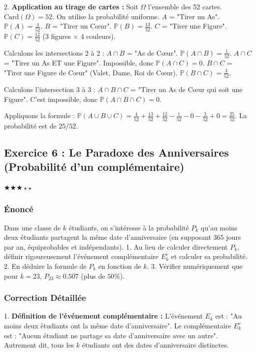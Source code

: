 \documentclass[11pt,a4paper]{article}
\begin{document}
2. \textbf{Application au tirage de cartes :}
Soit $\Omega$ l'ensemble des 52 cartes. $\text{Card}(\Omega) = 52$. On utilise la probabilité uniforme.
$A$ = "Tirer un As". $\mathbb{P}(A) = \frac{4}{52}$.
$B$ = "Tirer un Cœur". $\mathbb{P}(B) = \frac{13}{52}$.
$C$ = "Tirer une Figure". $\mathbb{P}(C) = \frac{12}{52}$ (3 figures $\times$ 4 couleurs).

Calculons les intersections 2 à 2 :
$A \cap B$ = "As de Cœur". $\mathbb{P}(A \cap B) = \frac{1}{52}$.
$A \cap C$ = "Tirer un As ET une Figure". Impossible, donc $\mathbb{P}(A \cap C) = 0$.
$B \cap C$ = "Tirer une Figure de Cœur" (Valet, Dame, Roi de Cœur). $\mathbb{P}(B \cap C) = \frac{3}{52}$.

Calculons l'intersection 3 à 3 :
$A \cap B \cap C$ = "Tirer un As de Cœur qui soit une Figure". C'est impossible, donc $\mathbb{P}(A \cap B \cap C) = 0$.

Appliquons la formule :
$\mathbb{P}(A \cup B \cup C) = \frac{4}{52} + \frac{13}{52} + \frac{12}{52} - \frac{1}{52} - 0 - \frac{3}{52} + 0 = \frac{25}{52}$.
La probabilité est de $25 / 52$.



\subsection*{Exercice 6 : Le Paradoxe des Anniversaires (Probabilité d'un complémentaire)}
$\bigstar\bigstar\bigstar\star\star$

\subsubsection*{Énoncé}

Dans une classe de $k$ étudiants, on s'intéresse à la probabilité $P_k$ qu'au moins deux étudiants partagent la même date d'anniversaire (en supposant $365$ jours par an, équiprobables et indépendants).
1. Au lieu de calculer directement $P_k$, définir rigoureusement l'événement complémentaire $E_k^c$ et calculer sa probabilité.
2. En déduire la formule de $P_k$ en fonction de $k$.
3. Vérifier numériquement que pour $k=23$, $P_{23} \approx 0.507$ (plus de $50\%$).


\subsubsection*{Correction Détaillée}

1. \textbf{Définition de l'événement complémentaire :}
L'événement $E_k$ est : "Au moins deux étudiants ont la même date d'anniversaire".
Le complémentaire $E_k^c$ est : "Aucun étudiant ne partage sa date d'anniversaire avec un autre". Autrement dit, tous les $k$ étudiants ont des dates d'anniversaire distinctes.
\end{document}
